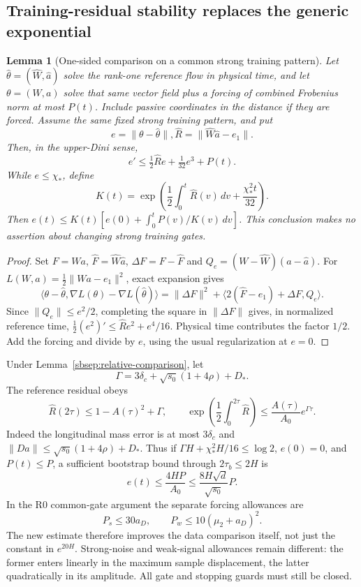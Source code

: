 \documentclass[11pt]{article}
\newtheorem{lemma}[theorem]{Lemma}
\theoremstyle{remark}
\begin{document}
\subsection{Training-residual stability replaces the generic exponential}

\begin{lemma}[One-sided comparison on a common strong training pattern]
\label{sbquant:stability}
Let $\widehat\theta=(\widehat W,\widehat a)$ solve the rank-one reference
flow in physical time, and let $\theta=(W,a)$ solve that same vector field
plus a forcing of combined Frobenius norm at most $P(t)$. Include passive
coordinates in the distance if they are forced. Assume the same fixed
strong training pattern, and put
\[
 e=\|\theta-\widehat\theta\|,
 \widehat R=\|\widehat W\widehat a-e_1\|.
\]
Then, in the upper-Dini sense,
\begin{equation}\label{sbquant:distance-ode}
 e'\le\tfrac12\widehat R e+\tfrac1{32}e^3+P(t).
\end{equation}
While $e\le\chi_*$, define
\[
 K(t)=\exp\left(\frac12\int_0^t\widehat R(v)\,dv
                     +\frac{\chi_*^2t}{32}\right).
\]
Then $e(t)\le K(t)[e(0)+\int_0^tP(v)/K(v)\,dv]$.
This conclusion makes no assertion about changing strong training gates.
\end{lemma}
\begin{proof}
Set $F=Wa$, $\widehat F=\widehat W\widehat a$,
$\Delta F=F-\widehat F$ and $Q_e=(W-\widehat W)(a-\widehat a)$.
For $L(W,a)=\frac12\|Wa-e_1\|^2$, exact expansion gives
\[
 \langle\theta-\widehat\theta,\nabla L(\theta)-\nabla L(\widehat\theta)\rangle
 =\|\Delta F\|^2+
   \langle2(\widehat F-e_1)+\Delta F,Q_e\rangle.
\]
Since $\|Q_e\|\le e^2/2$, completing the square in $\|\Delta F\|$
gives, in normalized reference time,
$\frac12(e^2)'\le\widehat R e^2+e^4/16$.
Physical time contributes the factor $1/2$. Add the forcing and divide
by $e$, using the usual regularization at $e=0$.
\end{proof}

Under Lemma~\ref{sbsep:relative-comparison}, let
\[
 \Gamma=3\delta_c+\sqrt{s_0}(1+4\rho)+D_*.
\]
The reference residual obeys
\[
 \widehat R(2\tau)\le1-A(\tau)^2+\Gamma,
 \qquad
 \exp\left(\frac12\int_0^{2\tau}\widehat R\right)
 \le\frac{A(\tau)}{A_0}e^{\Gamma\tau}.
\]
Indeed the longitudinal mass error is at most $3\delta_c$ and
$\|Da\|\le\sqrt{s_0}(1+4\rho)+D_*$.
Thus if $\Gamma H+\chi_*^2H/16\le\log2$, $e(0)=0$, and
$P(t)\le P$, a sufficient bootstrap bound through $2\tau_b\le2H$ is
\begin{equation}\label{sbquant:polynomial-comparison}
 e(t)\le\frac{4HP}{A_0}
 \le\frac{8H\sqrt d}{\sqrt{s_0}}P.
\end{equation}
In the R0 common-gate argument the separate forcing allowances are
\[
 P_s\le30a_D,\qquad P_w\le10(\mu_2+a_D)^2.
\]
The new estimate therefore improves the data comparison itself, not just
the constant in $e^{20H}$. Strong-noise and weak-signal allowances remain
different: the former enters linearly in the maximum sample displacement,
the latter quadratically in its amplitude. All gate and stopping guards
must still be closed.
\end{document}
